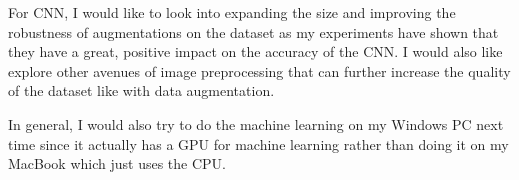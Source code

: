 \documentclass{article}
\begin{document}
For CNN, I would like to look into expanding the size and improving the
robustness of augmentations on the dataset as my experiments have shown that
they have a great, positive impact on the accuracy of the CNN. I would also like
explore other avenues of image preprocessing that can further increase the
quality of the dataset like with data augmentation.

In general, I would also try to do the machine learning on my Windows PC next
time since it actually has a GPU for machine learning rather than doing it on my
MacBook which just uses the CPU.
\end{document}
